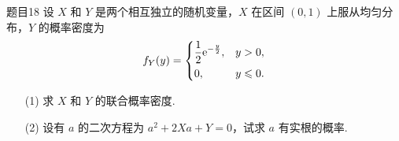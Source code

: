 \begin{question}{题目18}
    设 $X$ 和 $Y$ 是两个相互独立的随机变量，$X$ 在区间 $(0,1)$ 上服从均匀分布，$Y$ 的概率密度为
    $$
        f_Y(y) = \begin{dcases}
            \frac{1}{2}\mathrm{e}^{-\frac{y}{2}}, & y>0,           \\
            0,                                    & y \leqslant 0.
        \end{dcases}
    $$
    \begin{itemize}
        \item [(1)] 求 $X$ 和 $Y$ 的联合概率密度.
        \item [(2)] 设有 $a$ 的二次方程为 $a^2 + 2Xa + Y = 0$，试求 $a$ 有实根的概率.
    \end{itemize}
\end{question}
